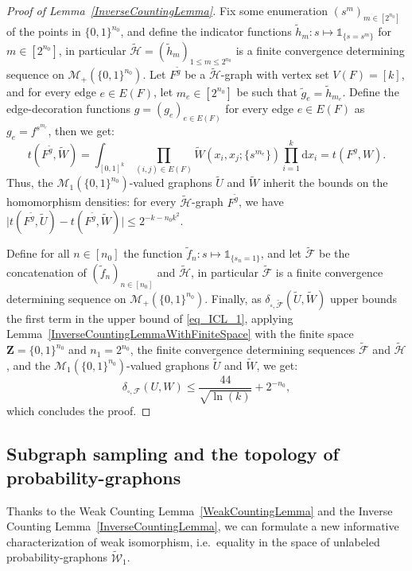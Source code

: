 \documentclass{amsart}
\newcommand{\ie}{i.e.\ }
\theoremstyle{plain}
\theoremstyle{definition}
\newcommand{\Space}{\mathbf{Z}}
\newcommand{\cH}{\mathcal{H}}
\newcommand{\ProbaX}[1]{\mathcal{M}_1(#1)}
\newcommand{\MeasX}[1]{\mathcal{M}_+(#1)}
\newcommand{\UGraphon}{\widetilde{\mathcal{W}}_1}
\newcommand{\ddcutF}{\delta_{\square,\mathcal{F}}}
\newcommand{\F}{\mathcal{F}}
\newcommand{\ddcutFtilde}{\delta_{\square,\tilde{\F}}}
\newcommand{\ind}{\mathds{1}}
\newcommand{\drv}{\mathrm{d}}
\begin{document}
\begin{proof}[Proof of Lemma~\ref{InverseCountingLemma}]
Fix some enumeration $(s^m)_{m \in [2^{n_0}]}$ of the points in $\{0,1\}^{n_0}$,
and define the indicator functions $\tilde{h}_m : s \mapsto \ind_{\{s=s^m\}}$ for $m\in [2^{n_0}]$,
	in particular $\tilde{\cH} = (\tilde{h}_m)_{1\leq m \leq 2^{n_0}}$
	is a finite convergence determining sequence on $\MeasX{\{0,1\}^{n_0}}$.
Let $F^{\tilde{g}}$ be a $\tilde{\cH}$-graph with vertex set $V(F)=[k]$,
and for every edge $e\in E(F)$, let $m_e\in [2^{n_0}]$ be such that
	$\tilde{g}_e = \tilde{h}_{m_e}$.
Define the edge-decoration functions $g=(g_e)_{e\in E(F)}$
	for every edge $e\in E(F)$ as $g_e = f^{s^{m_e}}$,
then we get:
\begin{equation*}
t(F^{\tilde g},\tilde{W}) 
= \int_{[0,1]^k} 	\prod_{(i, j)\in E(F)}
			\tilde{W}(x_i,x_j; \{ s^{m_e} \})
		\prod_{i=1}^k \drv x_i
= t(F^g,W)	.
\end{equation*}
Thus, the $\ProbaX{\{0,1\}^{n_0}}$-valued graphons $\tilde{U}$ and $\tilde{W}$
	inherit the bounds on the homomorphism densities:
	for every $\tilde{\cH}$-graph $F^{\tilde{g}}$, 
we have $\vert t(F^{\tilde{g}}, \tilde U) - t(F^{\tilde{g}}, \tilde W) \vert \leq 2^{-k - n_0 k^2}$. 


Define for all $n\in [n_0]$ the function $\tilde{f}_n : s \mapsto \ind_{\{s_n = 1 \}}$,
and let $\tilde{\F}$ be the concatenation of $(\tilde{f}_n)_{n\in [n_0]}$ and $\tilde{\cH}$,
in particular $\tilde{\F}$ is a finite convergence determining sequence on $\MeasX{\{0,1\}^{n_0}}$.
Finally, as $\ddcutFtilde(\tilde{U},\tilde{W})$ upper bounds the first term
in the upper bound of \eqref{eq_ICL_1},
applying Lemma~\ref{InverseCountingLemmaWithFiniteSpace} 
	with the finite space $\Space = \{0,1\}^{n_0}$
    and $n_1 = 2^{n_0}$,
	the finite convergence determining sequences $\tilde{\F}$ and $\tilde{\cH}$,
	and the $\ProbaX{\{0,1\}^{n_0}}$-valued graphons $\tilde{U}$ and $\tilde{W}$, 
we get:
\[ \ddcutF(U,W) \leq \frac{44}{\sqrt{\ln(k)}}  + 2^{-n_0} ,\]
which concludes the proof.
\end{proof}




\subsection{Subgraph sampling and the topology of probability-graphons}

Thanks to the Weak Counting Lemma~\ref{WeakCountingLemma}
and the Inverse Counting Lemma~\ref{InverseCountingLemma},
we can formulate a new informative characterization of 
weak isomorphism, \ie equality in the space
of unlabeled probability-graphons $\UGraphon$.
\end{document}
